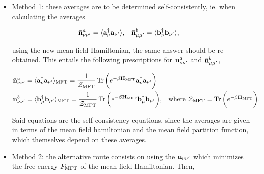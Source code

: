 \documentclass{homework}
\begin{document}
\begin{itemize}
    \item Method 1: these averages are to be determined self-consistently, ie. when calculating the averages 
    
    \begin{align}
        \bar{{\bf n}}_{\nu \nu'}^{a} &= \langle {\bf a}_{\nu}^\dagger {\bf a}_{\nu'} \rangle, & \bar{{\bf n}}_{\mu \mu'}^{b} &= \langle {\bf b}_{\nu}^\dagger {\bf b}_{\nu'} \rangle,
    \end{align}
    
    using the new mean field Hamiltonian, the same answer should be re-obtained. This entails the following prescriptions for $\bar{{\bf n}}_{\nu \nu'}^{a}$ and $\bar{{\bf n}}_{\mu \mu'}^{b}$,
    
     \begin{align}
        \bar{{\bf n}}_{\nu \nu'}^{a} &= \langle {\bf a}_{\nu}^\dagger {\bf a}_{\nu'} \rangle_{\textnormal{MFT}} = \frac{1}{\mathcal{Z}_{\textnormal{MFT}}} \Tr \bigg(e^{-\beta {\bf H}_{\textnormal{MFT}}} {\bf a}_{\nu}^\dagger {\bf a}_{\nu'}\bigg) 
        \\ \bar{{\bf n}}_{\nu \nu'}^{b} &= \langle {\bf b}_{\mu}^\dagger {\bf b}_{\mu'} \rangle_{\textnormal{MFT}} = \frac{1}{\mathcal{Z}_{\textnormal{MFT}}} \Tr \bigg(e^{-\beta {\bf H}_{\textnormal{MFT}}} {\bf b}_{\mu}^\dagger {\bf b}_{\mu'}\bigg), 
     \begin{array}{c} \textnormal{ where } 
             \mathcal{Z}_{\textnormal{MFT}} = \Tr \bigg(e^{-\beta {\bf H}_{\textnormal{MFT}}}\bigg).
        \end{array}
    \end{align}
    
    Said equations are the self-consistency equations, since the averages are given in terms of the mean field hamiltonian and the mean field partition function, which themselves depend on these averages. \\
    
    \item Method 2: the alternative route consists on using the ${\bf n}_{\nu \nu'}$ which minimizes the free energy $F_{\textnormal{MFT}}$ of the mean field Hamiltonian. Then, 
    

\end{itemize}
\end{document}
